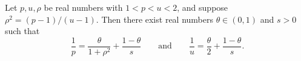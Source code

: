 \begin{lemma}
\leanok
{}
\label{BooleanAnalysis.Hypercontractivity.low_norms_interpolation_params}
Let $p, u, \rho$ be real numbers with $1 < p < u < 2$, and suppose $\rho^2 =
(p-1)/(u-1)$. Then there exist real numbers $\theta \in (0,1)$ and $s > 0$ such that
\[
  \frac{1}{p} = \frac{\theta}{1+\rho^2} + \frac{1-\theta}{s}
  \qquad\text{and}\qquad
  \frac{1}{u} = \frac{\theta}{2} + \frac{1-\theta}{s}.
\]
\end{lemma}
